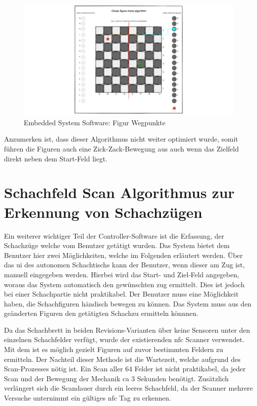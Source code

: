 \begin{figure}
\centering
\includegraphics{images/ATC_FigureMoveAlgorithm.png}
\caption{Embedded System Software: Figur Wegpunkte
\label{ATC_FigureMoveAlgorithm}}
\end{figure}

Anzumerken ist, dass dieser Algorithmus nicht weiter optimiert wurde,
somit führen die Figuren auch eine Zick-Zack-Bewegung aus auch wenn das
Zielfeld direkt neben dem Start-Feld liegt.

\hypertarget{schachfeld-scan-algorithmus-zur-erkennung-von-schachzuxfcgen}{%
\section{Schachfeld Scan Algorithmus zur Erkennung von
Schachzügen}\label{schachfeld-scan-algorithmus-zur-erkennung-von-schachzuxfcgen}}

Ein weiterer wichtiger Teil der Controller-Software ist die Erfassung,
der Schachzüge welche vom Benutzer getätigt wurden. Das System bietet
dem Benutzer hier zwei Möglichkeiten, welche im Folgenden erläutert
werden. Über das \gls{ui} des autonomen Schachtischs kann der Benutzer,
wenn dieser am Zug ist, manuell eingegeben werden. Hierbei wird das
Start- und Ziel-Feld angegeben, woraus das System automatisch den
gewünschten zug ermittelt. Dies ist jedoch bei einer Schachpartie nicht
praktikabel. Der Benutzer muss eine Möglichkeit haben, die Schachfiguren
händisch bewegen zu können. Das System muss aus den geänderten Figuren
den getätigten Schachzu ermitteln könnnen.

Da das Schachbrett in beiden Revisions-Varianten über keine Sensoren
unter den einzelnen Schachfelder verfügt, wurde der existierenden
\gls{nfc} Scanner verwendet. Mit dem ist es möglich gezielt Figuren auf
zuvor bestimmten Feldern zu ermitteln. Der Nachteil dieser Methode ist
die Wartezeit, welche aufgrund des Scan-Prozesses nötig ist. Ein Scan
aller 64 Felder ist nicht praktikabel, da jeder Scan und der Bewegung
der Mechanik ca 3 Sekunden benötigt. Zusätzlich verlängert sich die
Scandauer durch ein leeres Schachfeld, da der Scanner mehrere Versuche
unternimmt ein gültiges \gls{nfc} Tag zu erkennen.

